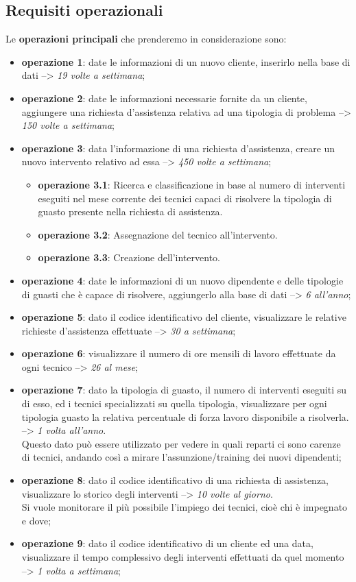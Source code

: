 \documentclass[legalpaper]{article}
\begin{document}
	\subsection{Requisiti operazionali}
	Le \textbf{operazioni principali} che prenderemo in considerazione sono:
	\begin{itemize}
		\item \textbf{operazione 1}: date le informazioni di un nuovo cliente, inserirlo nella base di dati --> \textit{19 volte a settimana};
		\item \textbf{operazione 2}: date le informazioni necessarie fornite da un cliente, aggiungere una richiesta d'assistenza relativa ad una tipologia di problema --> \textit{150 volte a settimana};
		\item \textbf{operazione 3}: data l'informazione di una richiesta d'assistenza, creare un nuovo intervento relativo ad essa --> \textit{450 volte a settimana};
		\begin{itemize}
			\item \textbf{operazione 3.1}: Ricerca e classificazione in base al numero di interventi eseguiti nel mese corrente dei tecnici capaci di risolvere la tipologia di guasto presente nella richiesta di assistenza.
			\item \textbf{operazione 3.2}: Assegnazione del tecnico all'intervento.
			\item \textbf{operazione 3.3}: Creazione dell'intervento.
		\end{itemize}
		\item \textbf{operazione 4}: date le informazioni di un nuovo dipendente e delle tipologie di guasti che è capace di risolvere, aggiungerlo alla base di dati --> \textit{6 all'anno};
		\item \textbf{operazione 5}: dato il codice identificativo del cliente, visualizzare le relative richieste d'assistenza effettuate --> \textit{30 a settimana};
		\item \textbf{operazione 6}: visualizzare il numero di ore mensili di lavoro effettuate da ogni tecnico --> \textit{26 al mese};
		\item \textbf{operazione 7}: dato la tipologia di guasto, il numero di interventi eseguiti su di esso, ed i tecnici specializzati su quella tipologia, visualizzare per ogni tipologia guasto la relativa percentuale di forza lavoro disponibile a risolverla.  --> \textit{1 volta all'anno}. \\ Questo dato può essere utilizzato per vedere in quali reparti ci sono carenze di tecnici, andando così a mirare l'assunzione/training dei nuovi dipendenti;
		\item \textbf{operazione 8}: dato il codice identificativo di una richiesta di assistenza, visualizzare lo storico degli interventi --> \textit{10 volte al giorno}. \\Si vuole monitorare il più possibile l'impiego dei tecnici, cioè chi è impegnato e dove;
		\item \textbf{operazione 9}: dato il codice identificativo di un cliente ed una data, visualizzare il tempo complessivo degli interventi effettuati da quel momento --> \textit{1 volta a settimana};
		
	\end{itemize}
\end{document}
